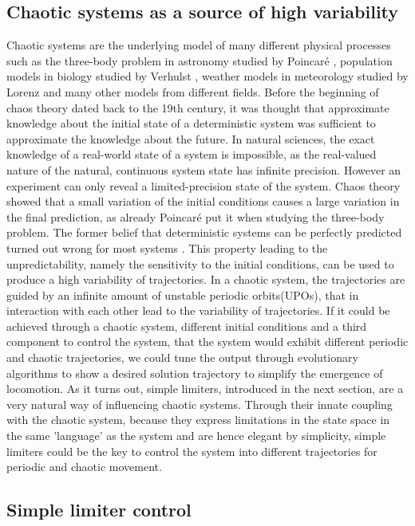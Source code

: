 \documentclass[main]{subfiles}
\begin{document}
\subsection{Chaotic systems as a source of high variability}

Chaotic systems are the underlying model of many different physical processes such as the three-body problem in astronomy studied by Poincaré \cite{bib:Poincare1892}, population models in biology studied by Verhulst \cite{bib:Verhulst1838}, weather models in meteorology studied by Lorenz \cite{bib:Lorenz1963} and many other models from different fields. Before the beginning of chaos theory dated back to the 19th century, it was thought that approximate knowledge about the initial state of a deterministic system was sufficient to approximate the knowledge about the future. In natural sciences, the exact knowledge of a real-world state of a system is impossible, as the real-valued nature of the natural, continuous system state has infinite precision. However an experiment can only reveal a limited-precision state of the system. Chaos theory showed that a small variation of the initial conditions causes a large variation in the final prediction, as already Poincaré put it when studying the three-body problem. The former belief that deterministic systems can be perfectly predicted turned out wrong for most systems \cite{bib:Motter2013}. This property leading to the unpredictability, namely the sensitivity to the initial conditions, can be used to produce a high variability of trajectories. In a chaotic system, the trajectories are guided by an infinite amount of unstable periodic orbits(UPOs), that in interaction with each other lead to the variability of trajectories. If it could be achieved through a chaotic system, different initial conditions and a third component to control the system, that the system would exhibit different periodic and chaotic trajectories, we could tune the output through evolutionary algorithms to show a desired solution trajectory to simplify the emergence of locomotion. As it turns out, simple limiters, introduced in the next section, are a very natural way of influencing chaotic systems. Through their innate coupling with the chaotic system, because they express limitations in the state space in the same 'language' as the system and are hence elegant by simplicity, simple limiters could be the key to control the system into different trajectories for periodic and chaotic movement.

\subsection{Simple limiter control}
\end{document}
